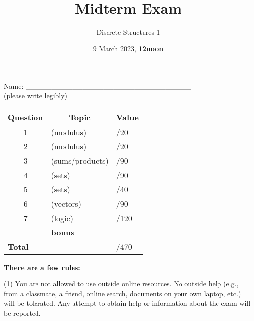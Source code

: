 \documentclass[11pt, oneside]{article}   	%
\title{Midterm Exam}
\author{Discrete Structures 1}
\date{9 March 2023, \textbf{12noon}}							%
\begin{document}
\maketitle
\begin{center}
Name: \_\_\_\_\_\_\_\_\_\_\_\_\_\_\_\_\_\_\_\_\_\_\_\_\_\_\_\_\_\_\_\_ \\(please write legibly) 
\end{center}

\begin{center}
\begin{tabular}{|c|l|l|}
\hline
\textbf{Question} & \multicolumn{1}{|c|}{\textbf{Topic}} & \multicolumn{1}{|c|}{\textbf{Value}}\\
\hline
\hline
1 & (modulus) & \hspace{3em}/20\\ \hline
2 & (modulus) & \hspace{3em}/20\\ \hline
3 & (sums/products) & \hspace{3em}/90\\ \hline
4 & (sets) & \hspace{3em}/90\\ \hline
5 & (sets) &  \hspace{3em}/40\\ \hline
6 & (vectors) & \hspace{3em}/90\\ \hline
7 & (logic) & \hspace{3em}/120\\ \hline
 & \textbf{bonus} &\\ \hline
 \hline
\hline
\multicolumn{2}{|l|}{\textbf{Total}} & \hspace{4em}/470\\
\hline
\end{tabular}
\end{center}


\textbf{\underline{There are a few rules:}}

(1) You are not allowed to use outside online resources. 
No outside help (e.g., from a classmate, a friend, online search, documents on your own laptop, etc.) will be tolerated. 
Any attempt to obtain help or information about the exam will be reported.
\end{document}
